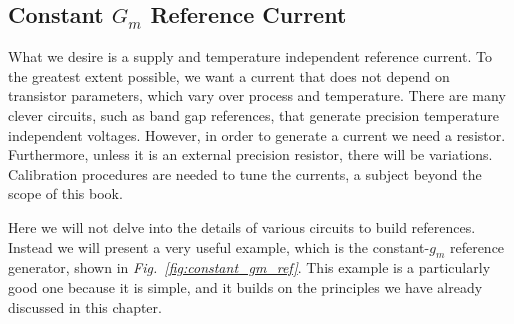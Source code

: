 \subsection{Constant \texorpdfstring{$G_m$}{Transconductance} Reference Current}
What we desire is a supply and temperature independent reference current.  To the greatest extent possible, we want a current that does not depend on transistor parameters, which vary over process and temperature.  There are many clever circuits, such as band gap references, that generate precision temperature independent voltages.  However, in order to generate a current we need a resistor.  Furthermore, unless it is an external precision resistor, there will be variations.  Calibration procedures are needed to tune the currents, a subject beyond the scope of this book.

Here we will not delve into the details of various circuits to build references.  Instead we will present a very useful example, which is the constant-$g_m$ reference generator, shown in \emph{Fig.~\ref{fig:constant_gm_ref}}.  This example is a particularly good one because it is simple, and it builds on the principles we have already discussed in this chapter.

